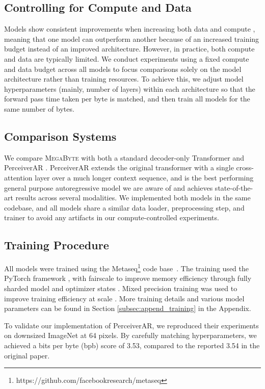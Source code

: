 \documentclass{article}
\newcommand{\fastslow}[0]{\textsc{MegaByte}\xspace}
\newcommand{\megabyte}[0]{\fastslow}
\theoremstyle{plain}
\theoremstyle{definition}
\theoremstyle{remark}
\begin{document}
\subsection{Controlling for Compute and Data}
    \label{sec:controlled_exp}
Models show consistent improvements when increasing both data and compute \cite{kaplan2020scaling,Chinchilla}, meaning that one model can outperform another because of an increased training budget instead of an improved architecture. However, in practice, both compute and data are typically limited. We conduct experiments using a fixed compute and data budget across all models to focus comparisons solely on the model architecture rather than training resources. To achieve this, we adjust model hyperparameters (mainly, number of layers) within each architecture so that the forward pass time taken per byte is matched, and then train all models for the same number of bytes.

\subsection{Comparison Systems}
We compare \megabyte with both a standard decoder-only Transformer and PerceiverAR \citep{perceiverar}. PerceiverAR extends the original transformer with a single cross-attention layer over a much longer context sequence, and is the best performing general purpose autoregressive model we are aware of 
 and achieves state-of-the-art results across several modalities. We implemented both models in the same codebase, and all models share a similar data loader, preprocessing step, and trainer to avoid any artifacts in our compute-controlled experiments.

\subsection{Training Procedure}
    \label{sec:training_proc}
    All models were trained using the Metaseq\footnote{https://github.com/facebookresearch/metaseq} code base~\cite{OPT}. The training used the PyTorch framework \cite{pytorch}, with fairscale to improve memory efficiency through fully sharded model and optimizer states \cite{fairscale}. Mixed precision training was used to improve training efficiency at scale \cite{mixedprecision}. More training details and various model parameters can be found in Section \ref{subsec:append_training} in the Appendix. 

To validate our implementation of PerceiverAR, we reproduced their experiments on downsized ImageNet at 64 pixels. By carefully matching hyperparameters, we achieved a bits per byte (bpb) score of 3.53, compared to the reported 3.54 in the original paper.
\end{document}
